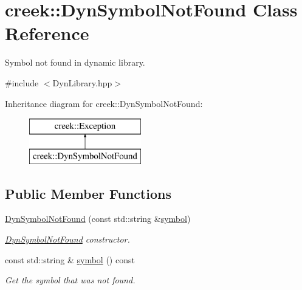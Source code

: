 \hypertarget{classcreek_1_1_dyn_symbol_not_found}{}\section{creek\+:\+:Dyn\+Symbol\+Not\+Found Class Reference}
\label{classcreek_1_1_dyn_symbol_not_found}


Symbol not found in dynamic library.  




{\ttfamily \#include $<$Dyn\+Library.\+hpp$>$}

Inheritance diagram for creek\+:\+:Dyn\+Symbol\+Not\+Found\+:\begin{figure}[H]
\begin{center}
\leavevmode
\includegraphics[height=2.000000cm]{classcreek_1_1_dyn_symbol_not_found}
\end{center}
\end{figure}
\subsection*{Public Member Functions}
\begin{DoxyCompactItemize}
\item 
\hyperlink{classcreek_1_1_dyn_symbol_not_found_aaa7fd2e9ab61debccdb71a2d4ae31e08}{Dyn\+Symbol\+Not\+Found} (const std\+::string \&\hyperlink{classcreek_1_1_dyn_symbol_not_found_a2b9037dab5c24db057e66354f75bb4ae}{symbol})
\begin{DoxyCompactList}\small\item\em {\ttfamily \hyperlink{classcreek_1_1_dyn_symbol_not_found}{Dyn\+Symbol\+Not\+Found}} constructor. \end{DoxyCompactList}\item 
const std\+::string \& \hyperlink{classcreek_1_1_dyn_symbol_not_found_a2b9037dab5c24db057e66354f75bb4ae}{symbol} () const \hypertarget{classcreek_1_1_dyn_symbol_not_found_a2b9037dab5c24db057e66354f75bb4ae}{}\label{classcreek_1_1_dyn_symbol_not_found_a2b9037dab5c24db057e66354f75bb4ae}

\begin{DoxyCompactList}\small\item\em Get the symbol that was not found. \end{DoxyCompactList}\end{DoxyCompactItemize}
